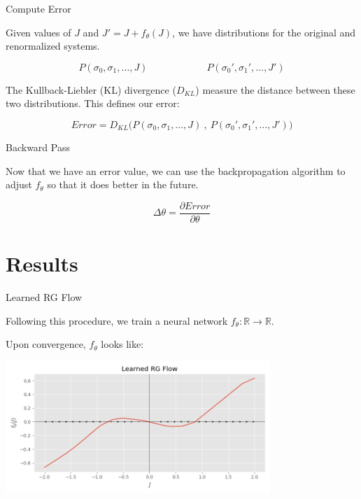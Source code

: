 \documentclass[aspectratio=169, 12pt]{beamer}
\begin{document}
\begin{frame}{Compute Error}

    Given values of $J$ and $J' = J + f_\theta(J)$, we have distributions for the original and renormalized systems. 

    \[
    P(\sigma_0, \sigma_1, \dots, J) 
    \qquad \qquad \qquad
    P(\sigma_0', \sigma_1', \dots, J') 
    \]

    The Kullback-Liebler (KL) divergence ($D_{KL}$) measure the distance between these two distributions. 
    This defines our error:

    \[
    Error = D_{KL} \Biggr (
    P(\sigma_0, \sigma_1, \dots, J)
    \: , \: 
    P(\sigma_0', \sigma_1', \dots, J') 
    \Biggr)
    \]

\end{frame}

\begin{frame}{Backward Pass}

    Now that we have an error value, we can use the backpropagation algorithm to adjust $f_\theta$ so that it does better in the future. 

    \[
    \Delta \theta = \frac{\partial Error}{\partial \theta}
    \]
    
\end{frame}

\section{Results}

\begin{frame}{Learned RG Flow}

    
    Following this procedure, we train a neural network $f_\theta : \mathbb{R} \rightarrow \mathbb{R}$. 

    Upon convergence, $f_\theta$ looks like:

    \begin{center}
        \includegraphics[width=0.75\textwidth]{
            images/a1_flows.png
        }
    \end{center}
    
\end{frame}
\end{document}
